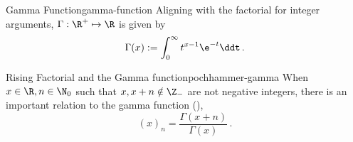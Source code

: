 \begin{definition}{Gamma Function}{gamma-function}
  Aligning with the factorial for integer arguments, $\Gamma: \R^+ \mapsto \R$ is given by
  $$\Gamma(x) := \int_0^\infty t^{x-1}\e^{-t} \ddt\,.$$
\end{definition}

\begin{remark}{Rising Factorial and the Gamma function}{pochhammer-gamma}
  When $x \in \R, n \in \N_0$ such that $x, x+n \notin \Z_-$ are not negative integers, there is an important relation to the gamma function (),
  $$(x)_n = \frac{\Gamma(x+n)}{\Gamma(x)}\,.$$
\end{remark}
